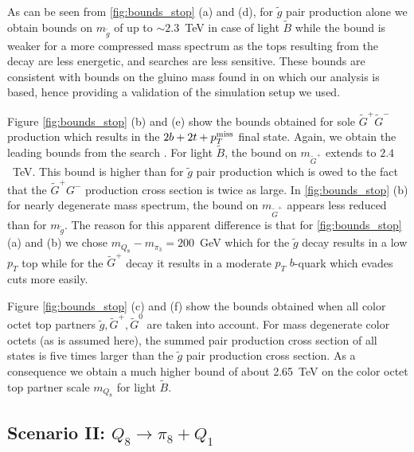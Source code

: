 \documentclass[preprintnumbers,nofootinbib,showpacs,eqsecnum,pre,12pt]{revtex4-1}
\def\ptmiss{p_{T}^{\rm miss}}
\begin{document}
As can be seen from \cref{fig:bounds_stop} (a) and (d), for $\tilde{g}$ pair production alone we obtain bounds on $m_{\tilde g}$ of up to $\sim 2.3$~TeV in case of light $\tilde B$ while the bound is weaker for a more compressed mass spectrum as the tops resulting from the decay are less energetic, and searches are less sensitive. These bounds are consistent with bounds on the gluino mass found in \cite{CMS:2019zmd} on which our analysis is based, hence providing a validation of the simulation setup we used.

Figure \ref{fig:bounds_stop} (b) and (e) show the bounds obtained for sole $\tilde{G}^+\tilde{G}^-$ production which results in the $2b + 2t + \ptmiss$ final state. Again, we obtain the leading bounds from the search \cite{CMS:2019zmd}. For light $\tilde B$, the bound on $m_{\tilde G^+}$ extends to $2.4$~TeV. This bound is higher than for $\tilde g$ pair production which is owed to the fact that the $\tilde G^+G^-$ production cross section is twice as large. In \cref{fig:bounds_stop} (b) for nearly degenerate mass spectrum, the bound on $m_{\tilde G^+}$ appears less reduced than for $m_{\tilde g}$. The reason for this apparent difference is that for \cref{fig:bounds_stop} (a) and (b) we chose $m_{Q_8}-m_{\pi_3} = 200$~GeV which for the $\tilde{g}$ decay results in a low $p_T$ top while for the $\tilde G^+$ decay it results in a moderate $p_T$ $b$-quark which evades cuts more easily.

Figure \ref{fig:bounds_stop} (c) and (f) show the bounds obtained when all color octet top partners $\tilde{g},\tilde{G}^+,\tilde{G}^0$ are taken into account. For mass degenerate color octets (as is assumed here), the summed pair production cross section of all states is five times larger than the $\tilde{g}$ pair production cross section. As a consequence we obtain a much higher bound of about 2.65~TeV on the color octet top partner scale $m_{Q_8}$ for light
$\tilde B$.  


\subsection{Scenario II: $Q_8\to \pi_8+Q_1$ }
\end{document}
